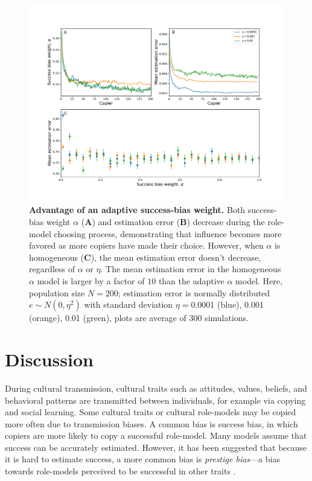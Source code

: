 \documentclass[12pt]{extarticle}
\begin{document}
\begin{figure}[H]
    \includegraphics[width=\linewidth]{../figures/final/choose_bias.pdf}
  \caption{
  \textbf{Advantage of an adaptive success-bias weight.}
  Both success-bias weight $\alpha$ (\textbf{A}) and estimation error (\textbf{B}) decrease during the role-model choosing process, demonstrating that influence becomes more favored as more copiers have made their choice.
However, when $\alpha$ is homogeneous (\textbf{C}), the mean estimation error doesn't decrease, regardless of $\alpha$ or $\eta$.
The mean estimation error in the homogeneous $\alpha$ model is larger by a factor of $10$ than the adaptive $\alpha$ model.
Here, population size $N=200$; estimation error is normally distributed $e \sim N(0,\eta^2)$ with standard deviation $\eta=$0.0001 (blue), 0.001 (orange), 0.01 (green), plots are average of $300$ simulations.}	
  \label{fig:influence_advantage}
\end{figure}



\clearpage
\section{Discussion}
During cultural transmission, cultural traits such as attitudes, values, beliefs, and behavioral patterns are transmitted between individuals, for example via copying and social learning.
Some cultural traits or cultural role-models may be copied more often due to transmission biases. 
A common bias is success bias, in which copiers are more likely to copy a successful role-model. Many models assume that success can be accurately estimated.
However, it has been suggested that because it is hard to estimate success, a more common bias is \textit{prestige bias}---a bias towards role-models perceived to be successful in other traits \citep{fijian_social_bias}.
\end{document}
